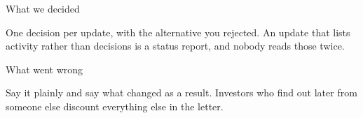 
\begin{frame}{What we decided}
  \begin{glass}
  One decision per update, with the alternative you rejected. An update that lists activity
  rather than decisions is a status report, and nobody reads those twice.
  \end{glass}
\end{frame}

\begin{frame}{What went wrong}
  \begin{glass}
  Say it plainly and say what changed as a result. Investors who find out later from someone
  else discount everything else in the letter.
  \end{glass}
\end{frame}
